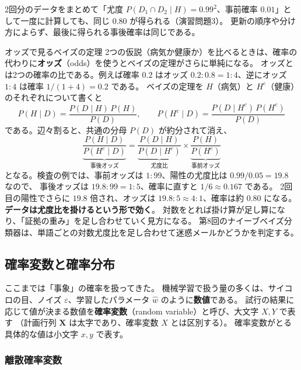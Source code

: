 2回分のデータをまとめて「尤度 $P(D_1 \cap D_2 \mid H) = 0.99^2$、事前確率 $0.01$」として一度に計算しても、同じ $0.80$ が得られる（演習問題3）。
更新の順序や分け方によらず、最後に得られる事後確率は同じである。

\begin{mlcolumn}{オッズで見るベイズの定理}
2つの仮説（病気か健康か）を比べるときは、確率の代わりに\textbf{オッズ}（odds）を使うとベイズの定理がさらに単純になる。
オッズとは2つの確率の比である。例えば確率 $0.2$ はオッズ $0.2 : 0.8 = 1 : 4$、逆にオッズ $1 : 4$ は確率 $1/(1 + 4) = 0.2$ である。
ベイズの定理を $H$（病気）と $H^c$（健康）のそれぞれについて書くと
\begin{equation*}
  P(H \mid D) = \frac{P(D \mid H)\,P(H)}{P(D)}, \qquad
  P(H^c \mid D) = \frac{P(D \mid H^c)\,P(H^c)}{P(D)}
\end{equation*}
である。辺々割ると、共通の分母 $P(D)$ が約分されて消え、
\begin{equation*}
  \underbrace{\frac{P(H \mid D)}{P(H^c \mid D)}}_{\text{事後オッズ}}
  = \underbrace{\frac{P(D \mid H)}{P(D \mid H^c)}}_{\text{尤度比}}
  \times \underbrace{\frac{P(H)}{P(H^c)}}_{\text{事前オッズ}}
\end{equation*}
となる。検査の例では、事前オッズは $1 : 99$、陽性の尤度比は $0.99/0.05 = 19.8$ なので、
事後オッズは $19.8 : 99 = 1 : 5$、確率に直すと $1/6 \approx 0.167$ である。
2回目の陽性でさらに $19.8$ 倍され、オッズは $19.8 : 5 \approx 4 : 1$、確率は約 $0.80$ になる。
\textbf{データは尤度比を掛けるという形で効く}。
対数をとれば掛け算が足し算になり、「証拠の重み」を足し合わせていく見方になる。
第8回のナイーブベイズ分類器は、単語ごとの対数尤度比を足し合わせて迷惑メールかどうかを判定する。
\end{mlcolumn}


\subsection{確率変数と確率分布}

ここまでは「事象」の確率を扱ってきた。
機械学習で扱う量の多くは、サイコロの目、ノイズ $\varepsilon$、学習したパラメータ $\hat{w}$ のように\textbf{数値}である。
試行の結果に応じて値が決まる数値を\textbf{確率変数}（random variable）と呼び、大文字 $X, Y$ で表す
（計画行列 $\bm{X}$ は太字であり、確率変数 $X$ とは区別する）。
確率変数がとる具体的な値は小文字 $x, y$ で表す。

\subsubsection{離散確率変数}

